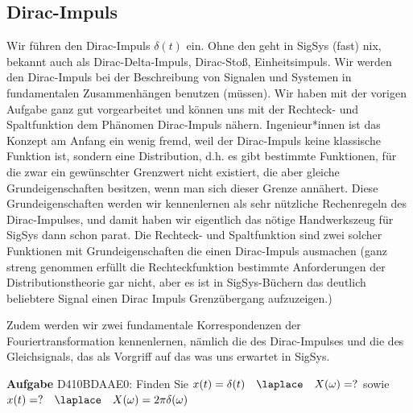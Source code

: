 \cleardoublepage
\subsection{Dirac-Impuls}
\label{sec:D410BDAAE0}
\begin{Ziel}
Wir führen den Dirac-Impuls $\delta(t)$ ein.
Ohne den geht in SigSys (fast) nix, bekannt auch als
Dirac-Delta-Impuls, Dirac-Stoß, Einheitsimpuls.
Wir werden den Dirac-Impuls bei der Beschreibung von Signalen und Systemen
in fundamentalen Zusammenhängen benutzen (müssen).
Wir haben mit der vorigen Aufgabe ganz gut vorgearbeitet und können uns
mit der Rechteck- und Spaltfunktion dem Phänomen Dirac-Impuls nähern.
Ingenieur*innen ist das Konzept am Anfang ein wenig fremd, weil
der Dirac-Impuls keine klassische Funktion ist, sondern eine Distribution, d.h.
es gibt bestimmte Funktionen, für die zwar ein gewünschter Grenzwert nicht existiert,
die aber gleiche Grundeigenschaften besitzen, wenn man sich dieser Grenze annähert.
Diese Grundeigenschaften werden wir kennenlernen als sehr nützliche
Rechenregeln des Dirac-Impulses, und damit haben wir eigentlich das nötige
Handwerkszeug für SigSys dann schon parat.
Die Rechteck- und Spaltfunktion sind zwei solcher Funktionen mit
Grundeigenschaften die einen Dirac-Impuls ausmachen (ganz streng genommen erfüllt
die Rechteckfunktion bestimmte Anforderungen der Distributionstheorie gar nicht,
aber es ist in SigSys-Büchern das deutlich beliebtere Signal einen Dirac Impuls
Grenzübergang aufzuzeigen.)

Zudem werden wir zwei fundamentale Korrespondenzen der Fouriertransformation
kennenlernen, nämlich die des Dirac-Impulses und die des Gleichsignals, das als
Vorgriff auf das was uns erwartet in SigSys.
\end{Ziel}
\textbf{Aufgabe} {\tiny D410BDAAE0}:
Finden Sie $x(t)=\delta(t)\quad \laplace \quad X(\omega)=?$ sowie
$x(t)= ? \quad \laplace \quad X(\omega)=2\pi \delta(\omega)$
